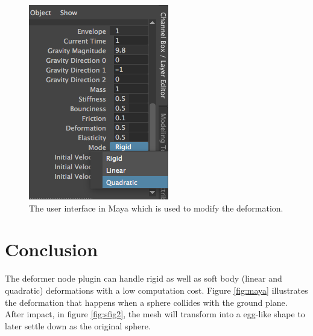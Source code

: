  \begin{figure}[t]
    \includegraphics[width=\linewidth]{img/gui.png}
    \caption{The user interface in Maya which is used to modify the deformation.}
    \label{fig:gui}
    \end{figure}

\section{Conclusion}

The deformer node plugin can handle rigid as well as soft body (linear and quadratic) deformations with a low computation cost. Figure \ref{fig:maya} illustrates the deformation that happens when a sphere collides with the ground plane. After impact, in figure \ref{fig:sfig2}, the mesh will transform into a egg-like shape to later settle down as the original sphere.

